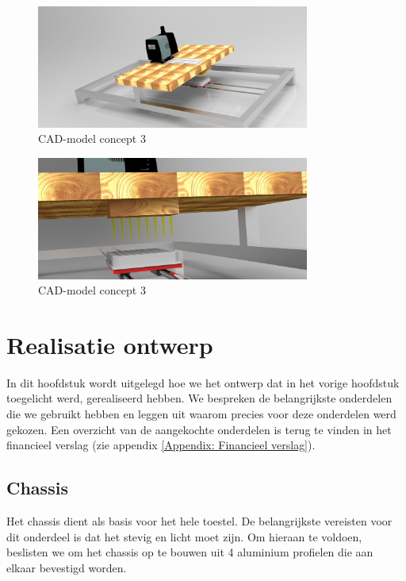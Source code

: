 \documentclass[a4paper,twoside,kulak]{kulakreport} %
\begin{document}
\begin{figure}[h]
	\centering
	\includegraphics[width=0.8\textwidth]{micdis1.jpg}
	\caption{CAD-model concept 3}
	\label{fig: CAD-model globaal}
	
\end{figure} 

\begin{figure}[h]
	\centering
	\includegraphics[width=0.8\textwidth]{micdis2.jpg}
	\caption{CAD-model concept 3}
	\label{fig: CAD-model ingezoomd}
	
\end{figure} 


\chapter{Realisatie ontwerp}

In dit hoofdstuk wordt uitgelegd hoe we het ontwerp dat in het vorige hoofdstuk toegelicht werd, gerealiseerd hebben. We bespreken de belangrijkste onderdelen die we gebruikt hebben en leggen uit waarom precies voor deze onderdelen werd gekozen. Een overzicht van de aangekochte onderdelen is terug te vinden in het financieel verslag (zie appendix \ref{Appendix: Financieel verslag}).

\section{Chassis}

Het chassis dient als basis voor het hele toestel. De belangrijkste vereisten voor dit onderdeel is dat het stevig en licht moet zijn. Om hieraan te voldoen, beslisten we om het chassis op te bouwen uit 4 aluminium profielen die aan elkaar bevestigd worden. 
\end{document}
